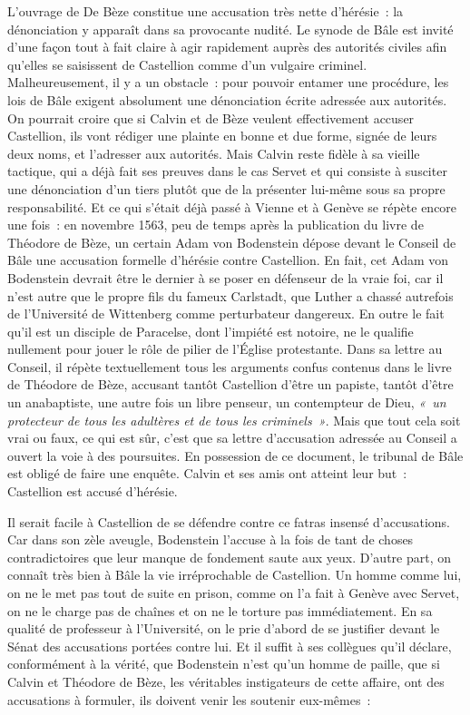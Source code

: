 \documentclass[french,twoside]{book} %
\newcommand{\astermono}{\medskip\centerline{\color{rubric}\large\selectfont{\syms ✻}}\medskip\par}%
\begin{document}
\noindent L’ouvrage de De Bèze constitue une accusation très nette d’hérésie : la dénonciation y apparaît dans sa provocante nudité. Le synode de Bâle est invité d’une façon tout à fait claire à agir rapidement auprès des autorités civiles afin qu’elles se saisissent de Castellion comme d’un vulgaire criminel. Malheureusement, il y a un obstacle : pour pouvoir entamer une procédure, les lois de Bâle exigent absolument une dénonciation écrite adressée aux autorités. On pourrait croire que si Calvin et de Bèze veulent effectivement accuser Castellion, ils vont rédiger une plainte en bonne et due forme, signée de leurs deux noms, et l’adresser aux autorités. Mais Calvin reste fidèle à sa vieille tactique, qui a déjà fait ses preuves dans le cas Servet et qui consiste à susciter une dénonciation d’un tiers plutôt que de la présenter lui-même sous sa propre responsabilité. Et ce qui s’était déjà passé à Vienne et à Genève se répète encore une fois : en novembre 1563, peu de temps après la publication du livre de Théodore de Bèze, un certain Adam von Bodenstein dépose devant le Conseil de Bâle une accusation formelle d’hérésie contre Castellion. En fait, cet Adam von Bodenstein devrait être le dernier à se poser en défenseur de la vraie foi, car il n’est autre que le propre fils du fameux Carlstadt, que Luther a chassé autrefois de l’Université de Wittenberg comme perturbateur dangereux. En outre le fait qu’il est un disciple de Paracelse, dont l’impiété est notoire, ne le qualifie nullement pour jouer le rôle de pilier de l’Église protestante. Dans sa lettre au Conseil, il répète textuellement tous les arguments confus contenus dans le livre de Théodore de Bèze, accusant tantôt Castellion d’être un papiste, tantôt d’être un anabaptiste, une autre fois un libre penseur, un contempteur de Dieu, \emph{« un protecteur de tous les adultères et de tous les criminels »}. Mais que tout cela soit vrai ou faux, ce qui est sûr, c’est que sa lettre d’accusation adressée au Conseil a ouvert la voie à des poursuites. En possession de ce document, le tribunal de Bâle est obligé de faire une enquête. Calvin et ses amis ont atteint leur but : Castellion est accusé d’hérésie.\par

\astermono

\noindent Il serait facile à Castellion de se défendre contre ce fatras insensé d’accusations. Car dans son zèle aveugle, Bodenstein l’accuse à la fois de tant de choses contradictoires que leur manque de fondement saute aux yeux. D’autre part, on connaît très bien à Bâle la vie irréprochable de Castellion. Un homme comme lui, on ne le met pas tout de suite en prison, comme on l’a fait à Genève avec Servet, on ne le charge pas de chaînes et on ne le torture pas immédiatement. En sa qualité de professeur à l’Université, on le prie d’abord de se justifier devant le Sénat des accusations portées contre lui. Et il suffit à ses collègues qu’il déclare, conformément à la vérité, que Bodenstein n’est qu’un homme de paille, que si Calvin et Théodore de Bèze, les véritables instigateurs de cette affaire, ont des accusations à formuler, ils doivent venir les soutenir eux-mêmes :\par
\end{document}
